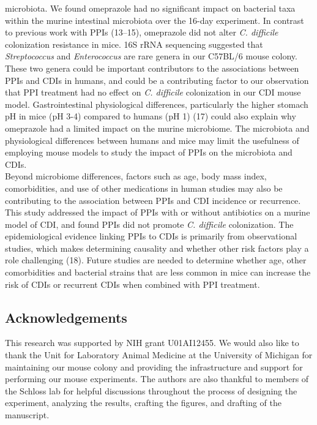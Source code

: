 \documentclass[11pt,]{article}
\begin{document}
microbiota. We found omeprazole had no significant impact on bacterial
taxa within the murine intestinal microbiota over the 16-day experiment.
In contrast to previous work with PPIs (13--15), omeprazole did not
alter \emph{C. difficile} colonization resistance in mice. 16S rRNA
sequencing suggested that \emph{Streptococcus} and \emph{Enterococcus}
are rare genera in our C57BL/6 mouse colony. These two genera could be
important contributors to the associations between PPIs and CDIs in
humans, and could be a contributing factor to our observation that PPI
treatment had no effect on \emph{C. difficile} colonization in our CDI
mouse model. Gastrointestinal physiological differences, particularly
the higher stomach pH in mice (pH 3-4) compared to humans (pH 1) (17)
could also explain why omeprazole had a limited impact on the murine
microbiome. The microbiota and physiological differences between humans
and mice may limit the usefulness of employing mouse models to study the
impact of PPIs on the microbiota and CDIs.\\
Beyond microbiome differences, factors such as age, body mass index,
comorbidities, and use of other medications in human studies may also be
contributing to the association between PPIs and CDI incidence or
recurrence. This study addressed the impact of PPIs with or without
antibiotics on a murine model of CDI, and found PPIs did not promote
\emph{C. difficile} colonization. The epidemiological evidence linking
PPIs to CDIs is primarily from observational studies, which makes
determining causality and whether other risk factors play a role
challenging (18). Future studies are needed to determine whether age,
other comorbidities and bacterial strains that are less common in mice
can increase the risk of CDIs or recurrent CDIs when combined with PPI
treatment.

\subsection{Acknowledgements}\label{acknowledgements}

This research was supported by NIH grant U01AI12455. We would also like
to thank the Unit for Laboratory Animal Medicine at the University of
Michigan for maintaining our mouse colony and providing the
infrastructure and support for performing our mouse experiments. The
authors are also thankful to members of the Schloss lab for helpful
discussions throughout the process of designing the experiment,
analyzing the results, crafting the figures, and drafting of the
manuscript.
\end{document}
